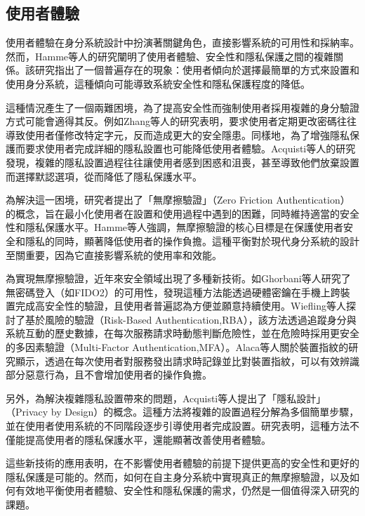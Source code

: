 \subsection{使用者體驗}
使用者體驗在身分系統設計中扮演著關鍵角色，直接影響系統的可用性和採納率。然而，Hamme等人\cite{inproceedings}的研究闡明了使用者體驗、安全性和隱私保護之間的複雜關係。該研究指出了一個普遍存在的現象：使用者傾向於選擇最簡單的方式來設置和使用身分系統，這種傾向可能導致系統安全性和隱私保護程度的降低。

這種情況產生了一個兩難困境，為了提高安全性而強制使用者採用複雜的身分驗證方式可能會適得其反。例如Zhang等人\cite{zhang2010security}的研究表明，要求使用者定期更改密碼往往導致使用者僅修改特定字元，反而造成更大的安全隱患。同樣地，為了增強隱私保護而要求使用者完成詳細的隱私設置也可能降低使用者體驗。Acquisti等人\cite{acquisti2017nudges}的研究發現，複雜的隱私設置過程往往讓使用者感到困惑和沮喪，甚至導致他們放棄設置而選擇默認選項，從而降低了隱私保護水平。

為解決這一困境，研究者提出了「無摩擦驗證」（Zero Friction Authentication）的概念，旨在最小化使用者在設置和使用過程中遇到的困難，同時維持適當的安全性和隱私保護水平。Hamme等人\cite{inproceedings}強調，無摩擦驗證的核心目標是在保護使用者安全和隱私的同時，顯著降低使用者的操作負擔。這種平衡對於現代身分系統的設計至關重要，因為它直接影響系統的使用率和效能。

為實現無摩擦驗證，近年來安全領域出現了多種新技術。如Ghorbani等人\cite{ghorbani2020fido2}研究了無密碼登入（如FIDO2）的可用性，發現這種方法能透過硬體密鑰在手機上跨裝置完成高安全性的驗證，且使用者普遍認為方便並願意持續使用。Wiefling等人\cite{wiefling2021rba}探討了基於風險的驗證（Risk-Based Authentication,RBA），該方法透過追蹤身分與系統互動的歷史數據，在每次服務請求時動態判斷危險性，並在危險時採用更安全的多因素驗證（Multi-Factor Authentication,MFA）\cite{bonneau2012mfa}。Alaca等人\cite{alaca2016devicefingerprinting}關於裝置指紋的研究顯示，透過在每次使用者對服務發出請求時記錄並比對裝置指紋，可以有效辨識部分惡意行為，且不會增加使用者的操作負擔。

另外，為解決複雜隱私設置帶來的問題，Acquisti等人\cite{acquisti2017nudges}提出了「隱私設計」（Privacy by Design）的概念。這種方法將複雜的設置過程分解為多個簡單步驟，並在使用者使用系統的不同階段逐步引導使用者完成設置。研究表明，這種方法不僅能提高使用者的隱私保護水平，還能顯著改善使用者體驗。

這些新技術的應用表明，在不影響使用者體驗的前提下提供更高的安全性和更好的隱私保護是可能的。然而，如何在自主身分系統中實現真正的無摩擦驗證，以及如何有效地平衡使用者體驗、安全性和隱私保護的需求，仍然是一個值得深入研究的課題。
